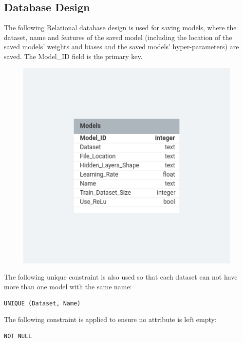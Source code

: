 \documentclass[./project-report/src/latex/project-report.tex]{subfiles}
\begin{document}
\pagebreak

\subsection{Database Design}

The following Relational database design is used for saving models, where the dataset, name and features of the saved model (including the location of the 
saved models' weights and biases and the saved models' hyper-parameters) are saved. The Model\_ID field is the primary key.

\begin{figure}[h!]
\centering
\includegraphics[width=1\textwidth]{./project-report/src/images/database-design.png}
\end{figure}

The following unique constraint is also used so that each dataset can not have more than one model with the same name:

\begin{verbatim}
UNIQUE (Dataset, Name)
\end{verbatim}

The following constraint is applied to ensure no attribute is left empty:

\begin{verbatim}
NOT NULL
\end{verbatim}
\end{document}
